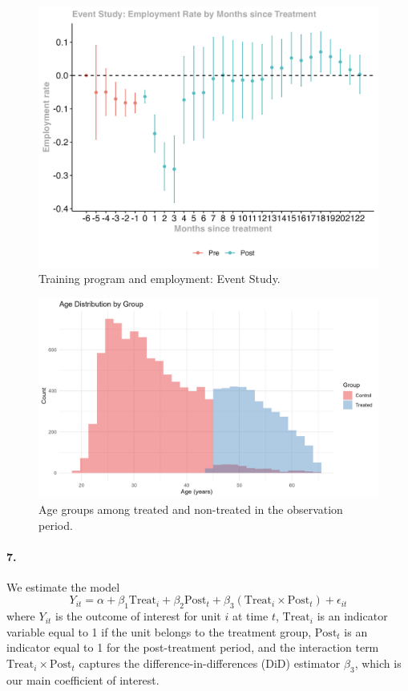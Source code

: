 \documentclass{scrartcl}
\begin{document}
\begin{figure}
    \centering
    \includegraphics[width=0.75\linewidth]{output/figures/final_event_study_employment_rate.jpg}
    \caption{Training program and employment: Event Study.}
    \label{fig:event_study}
\end{figure}

\begin{figure}
    \centering
    \includegraphics[width=0.75\linewidth]{output/figures/final_histogram_age.jpg}
    \caption{Age groups among treated and non-treated in the observation period.}
    \label{fig:age_hist}
\end{figure}

\paragraph*{7.}

We estimate the model
$$
Y_{it} = \alpha + \beta_1 \text{Treat}_i + \beta_2 \text{Post}_t + \beta_3 (\text{Treat}_i \times \text{Post}_t) + \epsilon_{it}
$$
where \( Y_{it} \) is the outcome of interest for unit \( i \) at time \( t \), \( \text{Treat}_i \) is an indicator variable equal to 1 if the unit belongs to the treatment group, \( \text{Post}_t \) is an indicator equal to 1 for the post-treatment period, and the interaction term \( \text{Treat}_i \times \text{Post}_t \) captures the difference-in-differences (DiD) estimator \( \beta_3 \), which is our main coefficient of interest.
\end{document}
